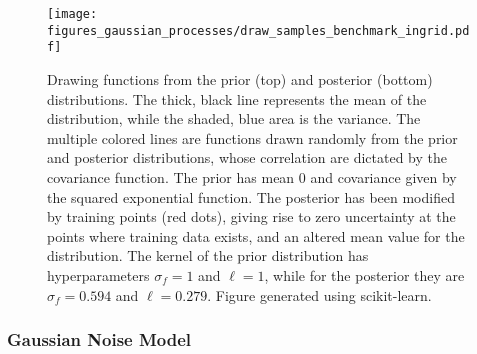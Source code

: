 \documentclass[twoside,english]{uiofysmaster}
\begin{document}
{\begin{figure}
\centering
\texttt{[image: figures\_gaussian\_processes/draw\_samples\_benchmark\_ingrid.pdf]}
\caption{Drawing functions from the prior (top) and posterior (bottom) distributions. The thick, black line represents the mean of the distribution, while the shaded, blue area is the variance. The multiple colored lines are functions drawn randomly from the prior and posterior distributions, whose correlation are dictated by the covariance function. The prior has mean 0 and covariance given by the squared exponential function. The posterior has been modified by training points (red dots), giving rise to zero uncertainty at the points where training data exists, and an altered mean value for the distribution. The kernel of the prior distribution has hyperparameters $\sigma_f = 1$ and $\ell = 1$, while for the posterior they are $\sigma_f = 0.594$ and $\ell = 0.279$. Figure generated using scikit-learn.}
\label{Fig:: gaussian process : prior posterior drawn samples}
\end{figure}

\subsubsection{Gaussian Noise Model}\label{Sec: gaussian process : Gaussian Noise Model}

}
\end{document}
